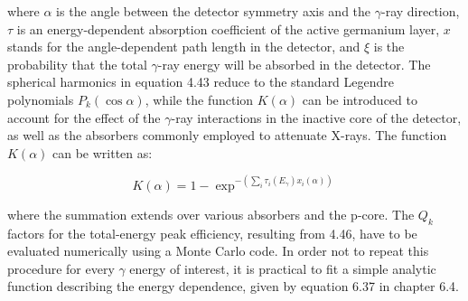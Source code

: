\documentclass[10pt]{article}
\begin{document}
where $\alpha$ is the angle between the detector symmetry axis and the $\gamma$-ray direction, $\tau$ is an energy-dependent absorption coefficient of the active germanium layer, $x$ stands for the angle-dependent path length in the detector, and $\xi$ is the probability that the total $\gamma$-ray energy will be absorbed in the detector. The spherical harmonics in equation 4.43 reduce to the standard Legendre polynomials $P_{k}(\cos \alpha)$, while the function $K(\alpha)$ can be introduced to account for the effect of the $\gamma$-ray interactions in the inactive core of the detector, as well as the absorbers commonly employed to attenuate X-rays. The function $K(\alpha)$ can be written as:


\begin{equation*}
K(\alpha)=1-\exp ^{-\left(\sum_{i} \tau_{i}\left(E_{\gamma}\right) x_{i}(\alpha)\right)} \tag{4.51}
\end{equation*}


where the summation extends over various absorbers and the p-core. The $Q_{k}$ factors for the total-energy peak efficiency, resulting from 4.46, have to be evaluated numerically using a Monte Carlo code. In order not to repeat this procedure for every $\gamma$ energy of interest, it is practical to fit a simple analytic function describing the energy dependence, given by equation 6.37 in chapter 6.4.
\end{document}
